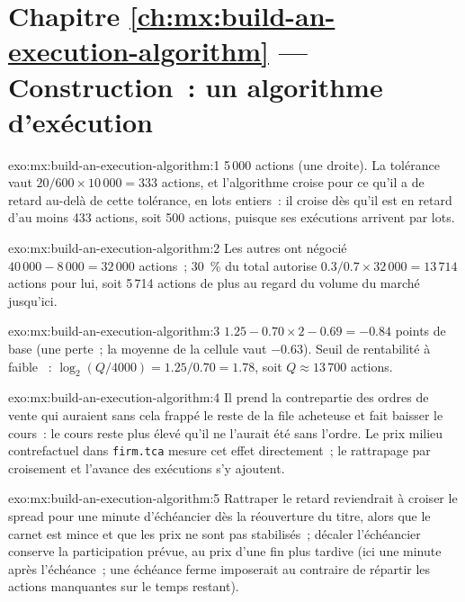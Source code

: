 \section*{Chapitre \ref{ch:mx:build-an-execution-algorithm} --- Construction~: un algorithme d'exécution}

\begin{solution}{exo:mx:build-an-execution-algorithm:1}
5\,000 actions (une droite). La tolérance vaut $20/600\times10\,000=333$ actions, et l'algorithme croise pour ce qu'il a de retard au-delà de cette tolérance, en
lots entiers~: il croise dès qu'il est en retard d'au moins 433 actions, soit 500 actions, puisque ses exécutions arrivent par lots.
\end{solution}

\begin{solution}{exo:mx:build-an-execution-algorithm:2}
Les autres ont négocié $40\,000-8\,000=32\,000$ actions~; 30~\% du total autorise $0.3/0.7\times32\,000=13\,714$ actions pour lui, soit 5\,714 actions de plus
au regard du volume du marché jusqu'ici.
\end{solution}

\begin{solution}{exo:mx:build-an-execution-algorithm:3}
$1.25-0.70\times2-0.69=-0.84$ points de base (une perte~; la moyenne de la cellule vaut $-0.63$). Seuil de rentabilité à faible ~: $\log_2(Q/4000)=1.25/0.70=1.78$, soit
$Q\approx13\,700$ actions.
\end{solution}

\begin{solution}{exo:mx:build-an-execution-algorithm:4}
Il prend la contrepartie des ordres de vente qui auraient sans cela frappé le reste de la file acheteuse et fait baisser le cours~: le cours reste plus élevé
qu'il ne l'aurait été sans l'ordre. Le prix milieu contrefactuel dans \texttt{firm.tca} mesure cet effet directement~; le rattrapage par croisement et l'avance des exécutions
s'y ajoutent.
\end{solution}

\begin{solution}{exo:mx:build-an-execution-algorithm:5}
Rattraper le retard reviendrait à croiser le spread pour une minute d'échéancier dès la réouverture du titre, alors que le carnet est mince et que les prix ne sont pas stabilisés~;
décaler l'échéancier conserve la participation prévue, au prix d'une fin plus tardive (ici une minute après l'échéance~; une échéance ferme imposerait au contraire de répartir les
actions manquantes sur le temps restant).
\end{solution}

